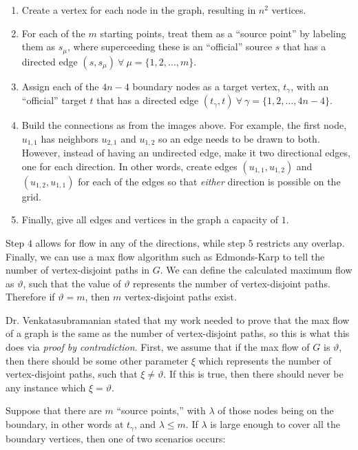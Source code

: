 \documentclass[addpoints]{exam}
\begin{document}
\begin{questions}
\begin{solution}
\begin{enumerate}
\item Create a vertex for each node in the graph, resulting in $n^{2}$ vertices.
\item For each of the $m$ starting points, treat them as a ``source point'' by labeling them as $s_{\mu}$, where superceeding these is an ``official'' source $s$ that has a directed edge $\left( s, s_{\mu}\right)\ \forall\ \mu=\{1,2,\ldots,m\}$.
\item Assign each of the $4n - 4$ boundary nodes as a target vertex, $t_{\gamma}$, with an ``official'' target $t$ that has a directed edge $\left( t_{\gamma}, t\right)\ \forall\ \gamma=\{1,2,\ldots,4n-4\}$.
\item Build the connections as from the images above. For example, the first node, $u_{1,1}$ has neighbors $u_{2,1}$ and $u_{1,2}$ so an edge needs to be drawn to both. However, instead of having an undirected edge, make it two directional edges, one for each direction. In other words, create edges $\left(u_{1,1},u_{1,2}\right)$ and $\left( u_{1,2}, u_{1,1}\right)$ for each of the edges so that {\em either} direction is possible on the grid.
\item Finally, give all edges and vertices in the graph a capacity of $1$.
\end{enumerate}

Step $4$ allows for flow in any of the directions, while step $5$ restricts any overlap. Finally, we can use a max flow algorithm such as Edmonds-Karp to tell the number of vertex-disjoint paths in $G$. We can define the calculated maximum flow as $\vartheta$, such that the value of $\vartheta$ represents the number of vertex-disjoint paths. Therefore if $\vartheta = m$, then $m$ vertex-disjoint paths exist.

Dr. Venkatasubramanian stated that my work needed to prove that the max flow of a graph is the same as the number of vertex-disjoint paths, so this is what this does via {\em proof by contradiction}. First, we assume that if the max flow of $G$ is $\vartheta$, then there should be some other parameter $\xi$ which represents the number of vertex-disjoint paths, such that $\xi \neq \vartheta$. If this is true, then there should never be any instance which $\xi = \vartheta$. 

Suppose that there are $m$ ``source points,'' with $\lambda$ of those nodes being on the boundary, in other words at $t_{\gamma}$, and $\lambda \leq m$. If $\lambda$ is large enough to cover all the boundary vertices, then one of two scenarios occurs:


\end{solution}
\end{questions}
\end{document}
